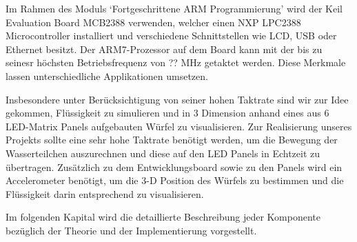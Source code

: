 Im Rahmen des Moduls `Fortgeschrittene ARM Programmierung' wird der Keil Evaluation Board MCB2388 verwenden, welcher einen NXP LPC2388 Microcontroller installiert und verschiedene Schnittstellen wie LCD, USB oder Ethernet besitzt. Der ARM7-Prozessor auf dem Board kann mit der bis zu seinesr höchsten Betriebsfrequenz von ?? MHz getaktet werden. Diese Merkmale lassen unterschiedliche Applikationen umsetzen.

Insbesondere unter Berücksichtigung von seiner hohen Taktrate sind wir zur Idee gekommen, Flüssigkeit zu simulieren und in 3 Dimension anhand eines aus 6 LED-Matrix Panels aufgebauten Würfel zu visualisieren. Zur Realisierung unseres Projekts sollte eine sehr hohe Taktrate benötigt werden, um die Bewegung der Wasserteilchen auszurechnen und diese auf den LED Panels in Echtzeit zu übertragen. Zusätzlich zu dem Entwicklungsboard sowie zu den Panels wird ein Accelerometer benötigt, um die 3-D Position des Würfels zu bestimmen und die Flüssigkeit darin entsprechend zu visualisieren.

Im folgenden Kapital wird die detaillierte Beschreibung jeder Komponente bezüglich der Theorie und der Implementierung vorgestellt.


